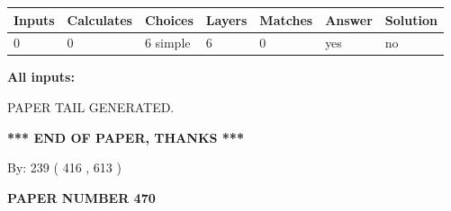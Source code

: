 \documentclass[12pt]{article}
\begin{document}
 
\noindent{}
 
 
   
   
   
   
\noindent\begin{tabular}{|l|l|l|l|l|l|l|}
 \hline
Inputs & Calculates & Choices & Layers & Matches & Answer & Solution \\ \hline
 0  & 
 0  & 
 6
  simple  
  & 
 6  & 
 0  & 
  yes & 
  no 
  \\ \hline
 \end{tabular}
   
   
   
   
\noindent{}
   
   
   
   
\noindent\vspace{0.1in}\hspace{-0.08in} {\textbf{\Large{All inputs: }}}
   
   
   
   
   
   
 \vspace{0.2in}
 
   
   
\vspace{2.0in} PAPER TAIL GENERATED.
   
   
   
   
\vspace{1.0in} 
{\textbf{\large{ *** END OF PAPER, THANKS *** }}} 
   
   
\hspace{1.0in} By: 
 239 ( 416 ,  613 )
   
   
   
   
\newpage 
\setcounter{page}{ 
   470001 } 
   
   
   
   
 {\textbf{ \Large{ PAPER NUMBER  470  }}}
   
   
\vspace{0.2in}
   
   
   
   
   
   
   
   
 \vspace{0.2in}
 
\end{document}
